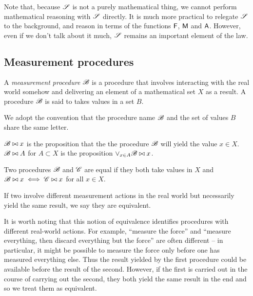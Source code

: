 Note that, because $\mathscr{S}$ is not a purely mathematical thing, we cannot perform mathematical reasoning with $\mathscr{S}$ directly. It is much more practical to relegate $\mathscr{S}$ to the background, and reason in terms of the functions $\mathsf{F}$, $\mathsf{M}$ and $\mathsf{A}$. However, even if we don't talk about it much, $\mathscr{S}$ remains an important element of the law.

\subsection{Measurement procedures}\label{sec:mprocs}

\begin{definition}
A \emph{measurement procedure} $\mathscr{B}$ is a procedure that involves interacting with the real world somehow and delivering an element of a mathematical set $X$ as a result. A procedure $\mathscr{B}$ is said to takes values in a set $B$.
\end{definition}

We adopt the convention that the procedure name $\mathscr{B}$ and the set of values $B$ share the same letter.

\begin{definition}
$\mathscr{B}\bowtie x$ is the proposition that the the procedure $\mathscr{B}$ will yield the value $x\in X$. $\mathscr{B}\bowtie A$ for $A\subset X$ is the proposition $\lor_{x\in A} \mathscr{B}\bowtie x$.
\end{definition}

\begin{definition}\label{def:equality}
Two procedures $\mathscr{B}$ and $\mathscr{C}$ are equal if they both take values in $X$ and $\mathscr{B}\bowtie x\iff \mathscr{C}\bowtie x$ for all $x\in X$.
\end{definition}

If two involve different measurement actions in the real world but necessarily yield the same result, we say they are equivalent.

It is worth noting that this notion of equivalence identifies procedures with different real-world actions. For example, ``measure the force'' and ``measure everything, then discard everything but the force'' are often different -- in particular, it might be possible to measure the force only before one has measured everything else. Thus the result yielded by the first procedure could be available before the result of the second. However, if the first is carried out in the course of carrying out the second, they both yield the same result in the end and so we treat them as equivalent. 

